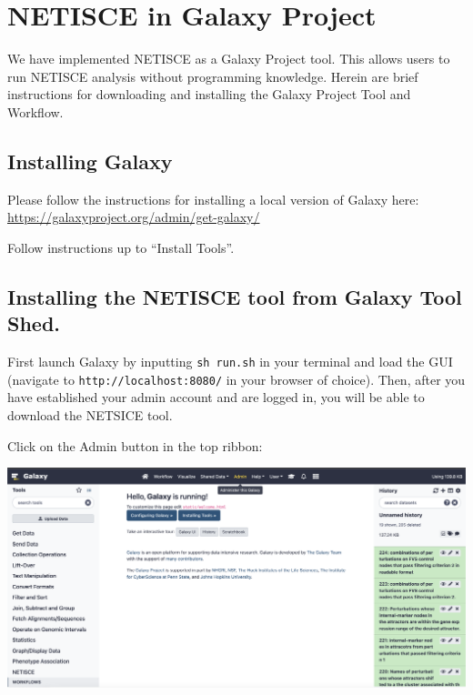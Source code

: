 \documentclass[
]{book}
\begin{document}
\hypertarget{netisce-in-galaxy-project}{%
\chapter{NETISCE in Galaxy Project}\label{netisce-in-galaxy-project}}

We have implemented NETISCE as a Galaxy Project tool. This allows users to run NETISCE analysis without programming knowledge. Herein are brief instructions for downloading and installing the Galaxy Project Tool and Workflow.

\hypertarget{installing-galaxy}{%
\section{Installing Galaxy}\label{installing-galaxy}}

Please follow the instructions for installing a local version of Galaxy here: \url{https://galaxyproject.org/admin/get-galaxy/}

Follow instructions up to ``Install Tools''.

\hypertarget{installing-the-netisce-tool-from-galaxy-tool-shed.}{%
\section{Installing the NETISCE tool from Galaxy Tool Shed.}\label{installing-the-netisce-tool-from-galaxy-tool-shed.}}

First launch Galaxy by inputting \texttt{sh\ run.sh} in your terminal and load the GUI (navigate to \texttt{http://localhost:8080/} in your browser of choice). Then, after you have established your admin account and are logged in, you will be able to download the NETSICE tool.

Click on the Admin button in the top ribbon:

\begin{center}\includegraphics[width=1\linewidth]{images/galaxy1} \end{center}
\end{document}
